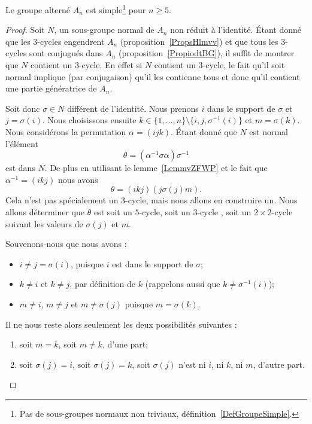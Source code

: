 \begin{theorem} \label{ThoURfSUXP}
    Le groupe alterné \( A_n\) est simple\footnote{Pas de sous-groupes normaux non triviaux, définition~\ref{DefGroupeSimple}.} pour \( n\geq 5\).
\end{theorem}


\begin{proof}
    Soit \( N\), un sous-groupe normal de \( A_n\) non réduit à l'identité. Étant donné que les \( 3\)-cycles engendrent \( A_n\) (proposition~\ref{PropsHlmvv}) et que tous les \( 3\)-cycles sont conjugués dans \( A_n\) (proposition~\ref{PropiodtBG}), il suffit de montrer que \( N\) contient un \( 3\)-cycle. En effet si \( N\) contient un \( 3\)-cycle, le fait qu'il soit normal implique (par conjugaison) qu'il les contienne tous et donc qu'il contient une partie génératrice de \( A_n\).

    Soit donc \( \sigma\in N\) différent de l'identité. Nous prenons \( i\) dans le support de \( \sigma\) et \( j=\sigma(i)\). Nous choisissons ensuite \( k\in\{ 1,\ldots, n \}\setminus\{ i,j,\sigma^{-1}(i) \}\) et \( m=\sigma(k)\). Nous considérons la permutation \( \alpha=(ijk)\). Étant donné que \( N\) est normal l'élément
    \begin{equation}
        \theta=(\alpha^{-1}\sigma\alpha)\sigma^{-1}
    \end{equation}
    est dans \( N\). De plus en utilisant le lemme~\ref{LemmvZFWP} et le fait que \( \alpha^{-1}=(ikj)\) nous avons
    \begin{equation}
        \theta=(ikj)(j\sigma(j)m).
    \end{equation}
    Cela n'est pas spécialement un \( 3\)-cycle, mais nous allons en construire un. Nous allons déterminer que \( \theta\) est soit un \( 5\)-cycle, soit un \( 3\)-cycle , soit un \( 2\times 2\)-cycle suivant les valeurs de \( \sigma(j)\) et \( m\).

    Souvenons-nous que nous avons :
    \begin{itemize}
        \item
            \( i \neq j = \sigma(i) \), puisque $i$ est dans le support de \( \sigma \);
        \item
            \( k \neq i \) et \( k \neq j \), par définition de $k$ (rappelons aussi que \( k \neq \sigma^{-1}(i) \));
        \item
            \( m \neq i \), \( m \neq j \) et \( m \neq  \sigma(j) \) puisque \( m = \sigma(k) \).
    \end{itemize}
    Il ne nous reste alors seulement les deux possibilités suivantes :
    \begin{enumerate}
        \item
            soit \( m=k\), soit \( m \neq k \), d'une part;
        \item
            soit \( \sigma(j) = i \), soit \( \sigma(j) = k \), soit \( \sigma(j) \) n'est ni $i$, ni $k$, ni $m$, d'autre part.
    \end{enumerate}


\end{proof}
